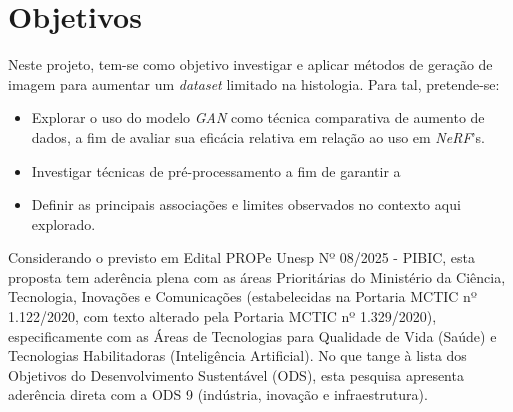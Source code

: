 \section{Objetivos}


Neste projeto, tem-se como objetivo investigar e aplicar métodos de geração de imagem para aumentar um \textit{dataset} limitado na histologia. Para tal, pretende-se:

\begin{itemize}
  \item Explorar o uso do modelo \textit{GAN} como técnica comparativa de aumento de dados, a fim de avaliar sua eficácia relativa em relação ao uso em \textit{NeRF}'s.
  \item Investigar técnicas de pré-processamento a fim de garantir a 
  \item Definir as principais associações e limites observados no contexto aqui explorado.
\end{itemize}

%
%    
%
Considerando o previsto em Edital PROPe Unesp Nº 08/2025 - PIBIC, esta proposta tem aderência plena com as áreas Prioritárias do Ministério da Ciência, Tecnologia, Inovações e Comunicações (estabelecidas na Portaria MCTIC nº 1.122/2020, com texto alterado pela Portaria MCTIC nº 1.329/2020), especificamente com as Áreas de Tecnologias para Qualidade de Vida (Saúde) e Tecnologias Habilitadoras (Inteligência Artificial). No que tange à lista dos Objetivos do Desenvolvimento Sustentável (ODS), esta pesquisa apresenta aderência direta com a ODS 9 (indústria, inovação e infraestrutura).
